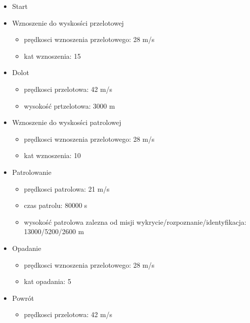         \begin{itemize}
            \item Start
            \item Wznoszenie do wyskosści przelotowej
                \begin{itemize}
                    \item prędkosci wznoszenia przelotowego: 28 m/s 
                    \item kat wznoszenia: 15\textdegree
                \end{itemize}
            \item Dolot
                \begin{itemize}
                    \item prędkosci przelotowa: 42 m/s 
                    \item wysokość prtzelotowa: 3000 m
                \end{itemize}
            \item Wznoszenie do wyskosści patrolowej 
                \begin{itemize}
                    \item prędkosci wznoszenia przelotowego: 28 m/s 
                    \item kat wznoszenia: 10\textdegree
                \end{itemize}
            \item Patrolowanie
                \begin{itemize}
                    \item prędkosci patrolowa: 21 m/s
                    \item czas patrolu: 80000 s
                    \item wysokość patrolowa zalezna od misji wykrycie/rozpoznanie/identyfikacja: 13000/5200/2600 m
                \end{itemize}
            \item Opadanie
                \begin{itemize}
                    \item prędkosci wznoszenia przelotowego: 28 m/s 
                    \item kat opadania: 5\textdegree
                \end{itemize}
            \item Powrót
                \begin{itemize}
                    \item prędkosci przelotowa: 42 m/s 

\end{itemize}
\end{itemize}
